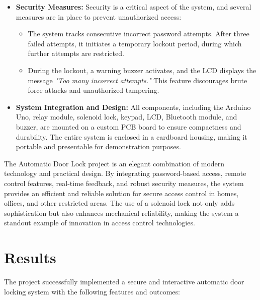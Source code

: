 \documentclass[a4paper, 12pt]{article}
\begin{document}
\begin{itemize}
    \item \textbf{Security Measures:} 
    Security is a critical aspect of the system, and several measures are in place to prevent unauthorized access:
    \begin{itemize}
        \item The system tracks consecutive incorrect password attempts. After three failed attempts, it initiates a temporary lockout period, during which further attempts are restricted.
        \item During the lockout, a warning buzzer activates, and the LCD displays the message \textit{"Too many incorrect attempts."} This feature discourages brute force attacks and unauthorized tampering.
    \end{itemize}

    \item \textbf{System Integration and Design:} 
    All components, including the Arduino Uno, relay module, solenoid lock, keypad, LCD, Bluetooth module, and buzzer, are mounted on a custom PCB board to ensure compactness and durability. The entire system is enclosed in a cardboard housing, making it portable and presentable for demonstration purposes.
\end{itemize}

The Automatic Door Lock project is an elegant combination of modern technology and practical design. By integrating password-based access, remote control features, real-time feedback, and robust security measures, the system provides an efficient and reliable solution for secure access control in homes, offices, and other restricted areas. The use of a solenoid lock not only adds sophistication but also enhances mechanical reliability, making the system a standout example of innovation in access control technologies.

\section{Results}

The project successfully implemented a secure and interactive automatic door locking system with the following features and outcomes:
\end{document}
